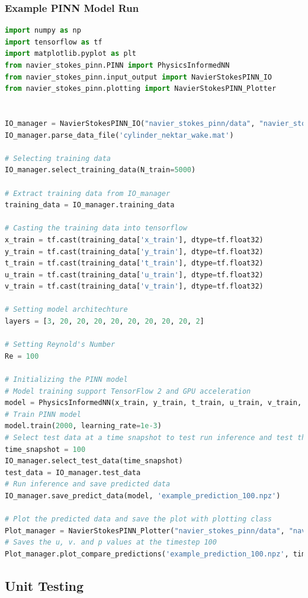 \subsubsection{Example PINN Model Run}
\begin{lstlisting}[language = Python]
import numpy as np
import tensorflow as tf
import matplotlib.pyplot as plt
from navier_stokes_pinn.PINN import PhysicsInformedNN
from navier_stokes_pinn.input_output import NavierStokesPINN_IO
from navier_stokes_pinn.plotting import NavierStokesPINN_Plotter


IO_manager = NavierStokesPINN_IO("navier_stokes_pinn/data", "navier_stokes_pinn/output")
IO_manager.parse_data_file('cylinder_nektar_wake.mat')

# Selecting training data
IO_manager.select_training_data(N_train=5000)

# Extract training data from IO_manager
training_data = IO_manager.training_data

# Casting the training data into tensorflow
x_train = tf.cast(training_data['x_train'], dtype=tf.float32)
y_train = tf.cast(training_data['y_train'], dtype=tf.float32)
t_train = tf.cast(training_data['t_train'], dtype=tf.float32)
u_train = tf.cast(training_data['u_train'], dtype=tf.float32)
v_train = tf.cast(training_data['v_train'], dtype=tf.float32)

# Setting model architechture
layers = [3, 20, 20, 20, 20, 20, 20, 20, 20, 2]

# Setting Reynold's Number
Re = 100

# Initializing the PINN model
# Model training support TensorFlow 2 and GPU acceleration
model = PhysicsInformedNN(x_train, y_train, t_train, u_train, v_train, Re, layers)
# Train PINN model
model.train(2000, learning_rate=1e-3)
# Select test data at a time snapshot to test run inference and test the trained model
time_snapshot = 100
IO_manager.select_test_data(time_snapshot)
test_data = IO_manager.test_data
# Run inference and save predicted data
IO_manager.save_predict_data(model, 'example_prediction_100.npz')

# Plot the predicted data and save the plot with plotting class
Plot_manager = NavierStokesPINN_Plotter("navier_stokes_pinn/data", "navier_stokes_pinn/plots", IO_manager)
# Saves the u, v. and p values at the timestep 100
Plot_manager.plot_compare_predictions('example_prediction_100.npz', time_snapshot)
\end{lstlisting}

\subsection{Unit Testing}









